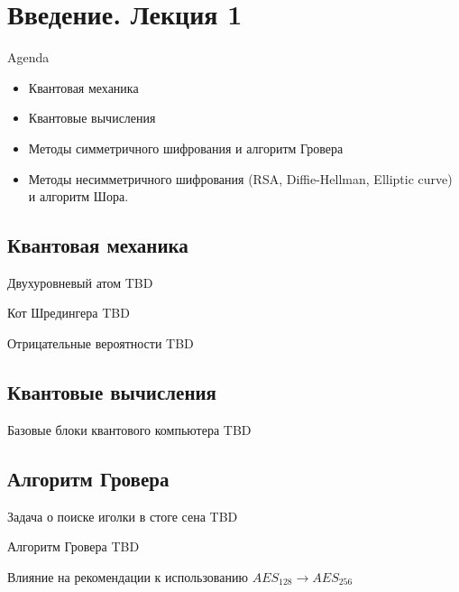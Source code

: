 \section{Введение. Лекция 1}

\begin{frame}{Agenda}
\begin{itemize}
\item Квантовая механика
\item Квантовые вычисления
\item Методы симметричного шифрования и алгоритм Гровера
\item Методы несимметричного шифрования (RSA, Diffie-Hellman, Elliptic
curve) и алгоритм Шора.
\end{itemize}
\end{frame}

\subsection{Квантовая механика}
\begin{frame}{Двухуровневый атом}
TBD
\end{frame}

\begin{frame}{Кот Шредингера}
TBD
\end{frame}

\begin{frame}{Отрицательные вероятности}
TBD
\end{frame}

\subsection{Квантовые вычисления}
\begin{frame}{Базовые блоки квантового компьютера}
TBD
\end{frame}

\subsection{Алгоритм Гровера}
\begin{frame}{Задача о поиске иголки в стоге сена}
TBD
\end{frame}

\begin{frame}{Алгоритм Гровера}
TBD
\end{frame}

\begin{frame}{Влияние на рекомендации к использованию}
$AES_{128} \rightarrow AES_{256}$
\end{frame}

